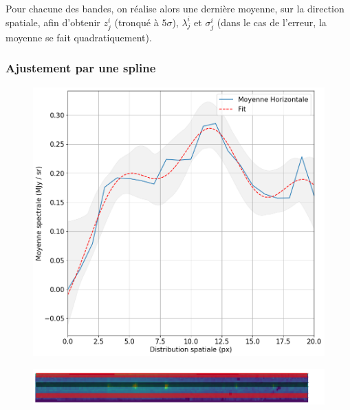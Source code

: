 \documentclass[12pt, a4paper]{article}
\begin{document}
Pour chacune des bandes, on réalise alors une dernière moyenne, sur la direction spatiale, afin d'obtenir $z^i_j$ (tronqué à $5\sigma$), $\lambda^i_j$ et $\sigma^i_j$ (dans le cas de l'erreur, la moyenne se fait quadratiquement).

\subsubsection{Ajustement par une spline}

\begin{figure}
  \begin{minipage}{\linewidth}
    \centering\captionsetup[subfigure]{justification=centering}
    \includegraphics[width=0.9\linewidth]{assets/fit_gaussian.png}
    \label{fig:profil_gauss}
    \par
    \vfill
    \includegraphics[width=\linewidth]{assets/extraction.png}
    \label{fig:extraction}
  \end{minipage}
\end{figure}
\end{document}
